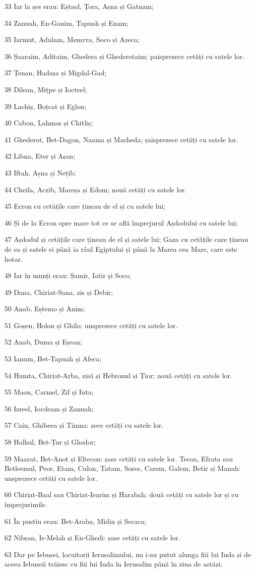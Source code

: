 \par 33 Iar la șes erau: Eștaol, Țora, Așna și Gatnam;
\par 34 Zanuah, En-Ganim, Tapuah și Enam;
\par 35 Iarmut, Adulam, Memvra, Soco și Azeca;
\par 36 Șaaraim, Aditaim, Ghedera și Ghederotaim; paisprezece cetăți cu satele lor.
\par 37 Țenan, Hadașa și Migdal-Gad;
\par 38 Dilean, Mițpe și Iocteel;
\par 39 Lachiș, Boțcat și Eglon;
\par 40 Cabon, Lahmas și Chitliș;
\par 41 Ghederot, Bet-Dagon, Naama și Macheda; șaisprezece cetăți cu satele lor.
\par 42 Libna, Eter și Așan;
\par 43 Iftah, Așna și Nețib;
\par 44 Cheila, Aczib, Mareșa și Edom; nouă cetăți cu satele lor.
\par 45 Ecron cu cetățile care țineau de el și cu satele lui;
\par 46 Și de la Ecron spre mare tot ce se află împrejurul Așdodului cu satele lui;
\par 47 Așdodul și cetățile care țineau de el și satele lui; Gaza cu cetățile care țineau de ea și satele ei până ia râul Egiptului și până la Marea cea Mare, care este hotar.
\par 48 Iar în munți erau: Șamir, Iatir și Soco;
\par 49 Dana, Chiriat-Sana, zis și Debir;
\par 50 Anab, Eștemo și Anim;
\par 51 Goșen, Holon și Ghilo: unsprezece cetăți cu satele lor.
\par 52 Anab, Duma și Eșean;
\par 53 Ianum, Bet-Tapuah și Afeca;
\par 54 Humta, Chiriat-Arba, zisă și Hebronul și Țior; nouă cetăți cu satele lor.
\par 55 Maon, Carmel, Zif și Iuta;
\par 56 Izreel, Iocdeam și Zanuah;
\par 57 Cain, Ghibeea și Timna: zece cetăți cu satele lor.
\par 58 Halhul, Bet-Țur și Ghedor;
\par 59 Maarat, Bet-Anot și Eltecon: șase cetăți cu satele lor. Tecoa, Efrata sau Betleemul, Peor, Etam, Culon, Tatam, Sores, Carem, Galem, Betir și Manah: unsprezece cetăți cu satele lor.
\par 60 Chiriat-Baal sau Chiriat-Iearim și Harabah; două cetăți cu satele lor și cu împrejurimile.
\par 61 În pustiu erau: Bet-Araba, Midin și Secaca;
\par 62 Nibșan, Ir-Melah și En-Ghedi: șase cetăți cu satele lor.
\par 63 Dar pe Iebusei, locuitorii Ierusalimului, nu i-au putut alunga fiii lui Iuda și de aceea Iebuseii trăiesc cu fiii lui Iuda în Ierusalim până în ziua de astăzi.

